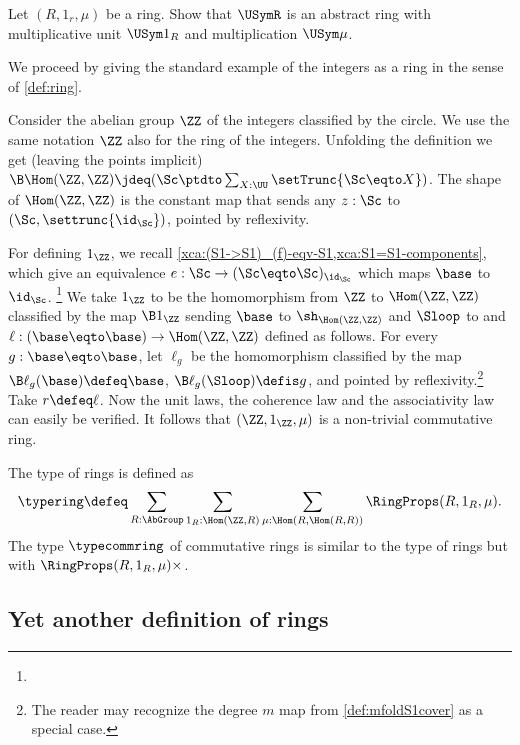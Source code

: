 \begin{xca}\label{xca:UR-abstractring}
Let $(R,1_r,\mu)$ be a ring. Show that $\USymR$ is an abstract ring with
multiplicative unit $\USym 1_R$ and multiplication $\USym\mu$. 
\end{xca}

We proceed by giving the standard example of the integers as a ring
in the sense of \cref{def:ring}.


\begin{example}
Consider the abelian group $\ZZ$ of the integers classified by the circle.
We use the same notation $\ZZ$ also for the ring of the integers.
Unfolding the definition we get (leaving the points implicit)
$\B\Hom(\ZZ,\ZZ) \jdeq(\Sc\ptdto\sum_{X:\UU}\setTrunc{\Sc\eqto X})$.
The shape of $\Hom(\ZZ,\ZZ)$ is the constant map 
that sends any $z:\Sc$ to $(\Sc,\settrunc{\id_{\Sc}})$, pointed by reflexivity.

For defining $1_\ZZ$, we
recall \cref{xca:(S1->S1)_(f)-eqv-S1,xca:S1=S1-components},
which give an equivalence $e:\Sc\to(\Sc\eqto\Sc)_{\id_\Sc}$
which maps $\base$ to $\id_\Sc$.%
\footnote{}
We take $1_\ZZ$ to be the homomorphism from $\ZZ$ to $\Hom(\ZZ,\ZZ)$
classified by the map $\B 1_\ZZ$ sending $\base$ to $\sh_{\Hom(\ZZ,\ZZ)}$
and $\Sloop$ to 
and $\ell: (\base\eqto\base)\to\Hom(\ZZ,\ZZ)$ defined as follows.
For every $g:\base\eqto\base$, let $\ell_g$ be the homomorphism
classified by the map $\B\ell_g(\base)\defeq\base$, 
$\B\ell_g(\Sloop)\defis g$, and pointed by reflexivity.\footnote{%
The reader may recognize the degree $m$
map from \cref{def:mfoldS1cover} as a special case.}
Take $r\defeq\ell$. Now the unit laws, the coherence law and
the associativity law can easily be verified. It follows that
$(\ZZ,1_\ZZ,\mu)$ is a non-trivial commutative ring.
\end{example}

\begin{definition}\label{def:typering}
The type of rings is defined as
\[
\typering\defeq\sum_{R:\AbGroup}\sum_{1_R:\Hom(\ZZ,R)}
                \sum_{\mu:\Hom(R,\Hom(R,R))} \RingProps(R,1_R,\mu).
\]
The type $\typecommring$ of commutative rings is similar to the type
of rings but with $\RingProps(R,1_R,\mu) \times \MB{TBD}$. 
\end{definition}

\subsection{Yet another  definition of rings}
\label{ssec:altring}

